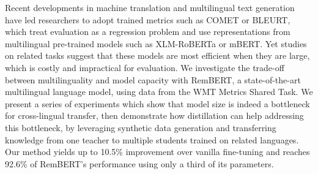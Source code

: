Recent developments in machine translation and multilingual text generation have led researchers to adopt trained metrics such as COMET or BLEURT, which treat evaluation as a regression problem and use representations from multilingual pre-trained models such as XLM-RoBERTa or mBERT. Yet studies on related tasks suggest that these models are most efficient when they are large, which is costly and impractical for evaluation. We investigate the trade-off between multilinguality and model capacity with RemBERT, a state-of-the-art multilingual language model, using data from the WMT Metrics Shared Task. We present a series of experiments which show that model size is indeed a bottleneck for cross-lingual transfer, then demonstrate how distillation can help addressing this bottleneck, by leveraging synthetic data generation and transferring knowledge from one teacher to multiple students trained on related languages. Our method yields up to 10.5\% improvement over vanilla fine-tuning and reaches 92.6\% of RemBERT's performance using only a third of its parameters.
